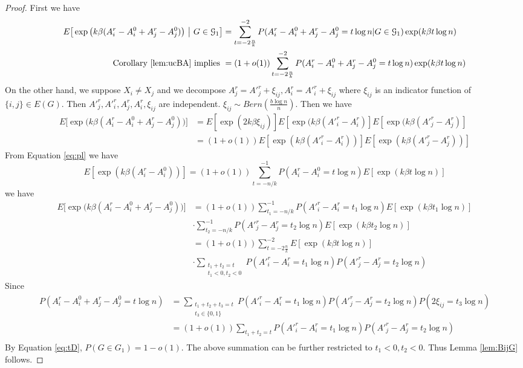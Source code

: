 \documentclass{article}
\begin{document}
\begin{proof}
First we have
\begin{align}
E \big[  \exp\big(k\beta (A^r_i - A^0_i + A^r_j - A^0_j) \big) ~\big|~ G\in\mathcal{G}_1 \big] 
&= \sum_{t=-2\frac{n}{k}}^{-2} P(A^r_i - A^0_i + A^r_j - A^0_j = t\log n | G \in \mathcal{G}_1) \exp(k\beta t \log n) \notag \\
\text{ Corollary \ref{lem:ucBA} implies }&= (1+o(1))\sum_{t=-2\frac{n}{k}}^{-2} P(A^r_i - A^0_i + A^r_j - A^0_j = t\log n) \exp(k\beta t \log n)
\end{align}
On the other hand, we suppose $X_i \neq X_j$ and we decompose $A^r_j = A'^r_j + \xi_{ij}, A^r_i = A'^r_i + \xi_{ij}$ where $\xi_{ij}$ is an indicator function of $\{i,j\} \in E(G)$. Then $A'^r_j, A'^r_i, A^r_j, A^r_i, \xi_{ij}$ are independent.
$\xi_{ij} \sim Bern(\frac{b\log n}{n})$.
Then we have
\begin{align*}
E \big[  \exp\big(k\beta (A^r_i - A^0_i + A^r_j - A^0_j ) \big) \big] & = E[\exp(2k\beta \xi_{ij})] E[\exp(k\beta (A'^r_i - A^r_i)]
E[\exp(k\beta (A'^r_j - A^r_j)] \\
& = (1+o(1))E[\exp(k\beta(A'^r_i - A^r_i))] E[\exp(k\beta(A'^r_j - A^r_j))]
\end{align*}
From Equation \eqref{eq:pl} we have
$$
E[\exp(k\beta(A^r_i - A^0_i))] = (1+o(1)) \sum_{t=-n/k}^{-1} P(A^r_i - A^0_i = t \log n)E[\exp(k\beta t \log n)]
$$
we have
\begin{align*}
E \big[  \exp\big(k\beta (A^r_i - A^0_i + A^r_j - A^0_j ) \big) \big] & = (1+o(1))
\sum_{t_1=-n/k}^{-1} P(A'^r_i - A^r_i = t_1 \log n)E[\exp(k\beta t_1 \log n)] \\
& \cdot
\sum_{t_2=-n/k}^{-1} P(A'^r_j - A^r_j = t_2 \log n)E[\exp(k\beta t_2 \log n)] \\
& = (1+o(1))  \sum_{t=-2\frac{n}{k}}^{-2} E[\exp(k\beta t \log n)]\\
& \cdot \sum_{\substack{t_1 + t_2 = t \\ t_1 < 0, t_2 < 0}}
P(A'^r_i - A^r_i = t_1 \log n) P(A'^r_j - A^r_j = t_2\log n)
\end{align*}
Since 
\begin{align*}
P(A^r_i - A^0_i + A^r_j - A^0_j = t\log n)
&= \sum_{\substack{t_1 + t_2 + t_3 = t\\ t_3 \in\{0, 1\}}} P(A'^r_i - A^r_i = t_1 \log n) P(A'^r_j - A^r_j = t_2 \log n) P(2\xi_{ij} = t_3 \log n) \\
&=(1+o(1)) \sum_{t_1 + t_2 = t} P(A'^r_i - A^r_i = t_1 \log n) P(A'^r_j - A^r_j = t_2 \log n)  \\
\end{align*}
By Equation \ref{eq:tD}, $P(G\in G_1) = 1-o(1)$. The above summation can be further restricted to $t_1 < 0, t_2 < 0$. Thus Lemma \ref{lem:BijG} follows. 
\end{proof}
\end{document}
